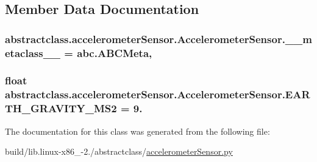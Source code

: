 \subsection{Member Data Documentation}
\hypertarget{classabstractclass_1_1accelerometerSensor_1_1AccelerometerSensor_a53073c73f7287a6e8b3bfcb0873f5ab8}{}
\subsubsection[{\+\_\+\+\_\+metaclass\+\_\+\+\_\+}]{\setlength{\rightskip}{0pt plus 5cm}abstractclass.\+accelerometer\+Sensor.\+Accelerometer\+Sensor.\+\_\+\+\_\+metaclass\+\_\+\+\_\+ = abc.\+A\+B\+C\+Meta\hspace{0.3cm}{\ttfamily [static]}, {\ttfamily [private]}}\label{classabstractclass_1_1accelerometerSensor_1_1AccelerometerSensor_a53073c73f7287a6e8b3bfcb0873f5ab8}
\hypertarget{classabstractclass_1_1accelerometerSensor_1_1AccelerometerSensor_a6fdd088fa80797f3101d1a5ea9b741db}{}
\subsubsection[{E\+A\+R\+T\+H\+\_\+\+G\+R\+A\+V\+I\+T\+Y\+\_\+\+M\+S2}]{\setlength{\rightskip}{0pt plus 5cm}float abstractclass.\+accelerometer\+Sensor.\+Accelerometer\+Sensor.\+E\+A\+R\+T\+H\+\_\+\+G\+R\+A\+V\+I\+T\+Y\+\_\+\+M\+S2 = 9.\hspace{0.3cm}{\ttfamily [static]}}\label{classabstractclass_1_1accelerometerSensor_1_1AccelerometerSensor_a6fdd088fa80797f3101d1a5ea9b741db}


The documentation for this class was generated from the following file\+:\begin{DoxyCompactItemize}
\item 
build/lib.\+linux-\/x86\+\_-\/2./abstractclass/\hyperlink{build_2lib_8linux-x86__64-2_87_2abstractclass_2accelerometerSensor_8py}{accelerometer\+Sensor.\+py}\end{DoxyCompactItemize}
